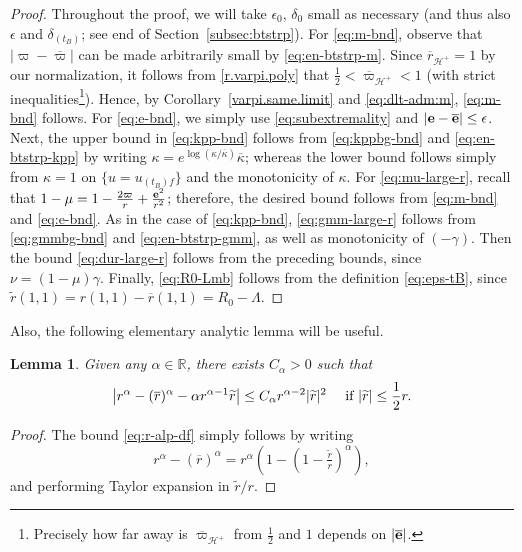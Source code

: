 \documentclass[10pt, reqno]{amsart}
\newtheorem{lemma}[theorem]{Lemma}
\theoremstyle{definition}
\theoremstyle{remark}
\theoremstyle{conjecture}
\numberwithin{equation}{section}
\newcommand{\abs}[1]{\vert#1\vert}
\newcommand{\ep}{\epsilon}
\newcommand{\0}{\emptyset}
\newcommand{\alp}{\alpha}
\newcommand{\gmm}{\gamma}
\newcommand{\dlt}{\delta}
\newcommand{\eps}{\epsilon}
\newcommand{\kpp}{\kappa}
\newcommand{\lmb}{\lambda}
\newcommand{\Lmb}{\Lambda}
\newcommand{\bfe}{{\bf e}}
\newcommand{\bbR}{\mathbb R}
\newcommand{\calH}{\mathcal H}
\newcommand{\dur}{\nu}
\newcommand{\dvr}{\lmb}
\newcommand{\f}{\frac}
\newcommand{\de}{\delta}
\newcommand{\EH}{\calH^{+}}
\newcommand{\e}{\bfe}							%
\newcommand{\rbg}{\overline{r}}					%
\newcommand{\varpibg}{\overline{\varpi}}				%
\newcommand{\kppbg}{\overline{\kpp}}					%
\newcommand{\ebg}{\overline{\e}}					%
\newcommand{\rdf}{\widetilde{r}}					%
\newcommand{\Abs}[1]{\left\vert #1 \right\vert}
\begin{document}
\begin{proof}
Throughout the proof, we will take $\eps_0$, $\de_0$ small as necessary (and thus also $\ep$ and $\dlt_{(t_B)}$; see end of Section~\ref{subsec:btstrp}). For \eqref{eq:m-bnd}, observe that $\abs{\varpi - \varpibg}$ can be made arbitrarily small by \eqref{eq:en-btstrp-m}. Since $\rbg_{\EH}=1$ by our normalization, it follows from \eqref{r.varpi.poly} that $\f 12<\overline{\varpi}_{\EH}<1$ (with strict inequalities\footnote{Precisely how far away is $\overline{\varpi}_{\EH}$ from $\f 12$ and $1$ depends on $|\ebg|$.}). Hence, by Corollary~\ref{varpi.same.limit} and \eqref{eq:dlt-adm:m}, \eqref{eq:m-bnd} follows. For \eqref{eq:e-bnd}, we simply use \eqref{eq:subextremality} and $\abs{\e - \ebg} \leq \eps$. Next, the upper bound in \eqref{eq:kpp-bnd} follows from \eqref{eq:kppbg-bnd} and \eqref{eq:en-btstrp-kpp} by writing $\kpp = e^{\log (\kpp/\kppbg)} \kppbg$; whereas the lower bound follows simply from $\kappa=1$ on $\{u=u_{(t_B)f}\}$ and the monotonicity of $\kappa$. 
For \eqref{eq:mu-large-r}, recall that $1 - \mu = 1 - \frac{2 \varpi}{r} + \frac{\e^{2}}{r^{2}}$; therefore, the desired bound follows from \eqref{eq:m-bnd} and \eqref{eq:e-bnd}.
As in the case of \eqref{eq:kpp-bnd}, \eqref{eq:gmm-large-r} follows from \eqref{eq:gmmbg-bnd} and \eqref{eq:en-btstrp-gmm}, as well as monotonicity of $(-\gamma)$. Then the bound \eqref{eq:dur-large-r} follows from the preceding bounds, since $\dur = (1-\mu) \gmm$.
Finally, \eqref{eq:R0-Lmb} follows from the definition \eqref{eq:eps-tB}, since $\rdf (1, 1) = r(1, 1) - \rbg(1, 1) = R_{0} - \Lmb$. \qedhere
\end{proof}

Also, the following elementary analytic lemma will be useful.
\begin{lemma} \label{lem:r-alp-df}
Given any $\alp \in \bbR$, there exists $C_{\alp} > 0$ such that
\begin{equation} \label{eq:r-alp-df}
	\Abs{r^{\alp} - (\rbg)^{\alp} - \alp r^{\alp-1} \rdf} \leq C_{\alp} r^{\alp-2} \abs{\rdf}^{2} \quad \hbox{ if } \abs{\rdf} \leq \frac{1}{2} r.
\end{equation}
\end{lemma}
\begin{proof}
The bound \eqref{eq:r-alp-df} simply follows by writing
\begin{equation*}
r^{\alp} - (\rbg)^{\alp} = r^{\alp} \left( 1 - \left( 1 - \tfrac{\rdf}{r} \right)^{\alp} \right),
\end{equation*}
and performing Taylor expansion in $\rdf / r$. \qedhere
\end{proof}
\end{document}

